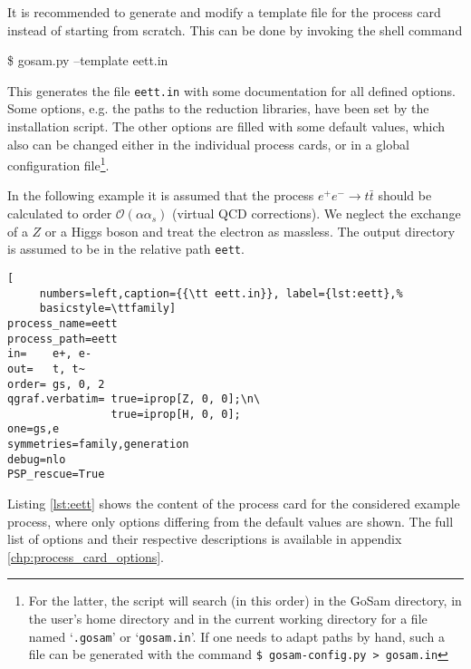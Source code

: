 \documentclass[11pt,a4paper]{refrep}
\newcommand{\gosamversion}{{3{.}0}}
\newcommand{\gosamv}[1][\gosamversion]{{\sc GoSam}\xspace}
\begin{document}
It is recommended to generate and modify a template file for the 
process card instead of
starting from scratch. This can be done by invoking the shell command
\begin{example}
\$ gosam.py --template eett.in
\end{example}
This generates the file \texttt{eett.in} with some documentation
for all defined options. Some options, e.g. the paths to the reduction libraries, 
have been set by the installation script.
The other options are filled with some default values,
which also can be changed either in the individual process cards, 
or in a global configuration file\footnote{
For the latter, the script will search (in this order) in the \gosamv{} directory,
in the user's home directory and in the current working directory for a file
named `\texttt{.gosam}' or `\texttt{gosam.in}'. If one needs to adapt paths by
hand, such a file can be generated with the command
{\tt \$ gosam-config.py > gosam.in}}.

In the following  example it is assumed that the process
$e^+e^-\rightarrow t\bar{t}$ should be calculated to order
$\mathcal{O}(\alpha\alpha_s)$ (virtual QCD corrections).
We neglect the exchange of a $Z$ or a Higgs boson and treat the electron as massless.
The output directory is assumed to be in the relative path
\texttt{eett}. 

\begin{lstlisting}[
     numbers=left,caption={{\tt eett.in}}, label={lst:eett},%
     basicstyle=\ttfamily] 
process_name=eett
process_path=eett
in=    e+, e-
out=   t, t~
order= gs, 0, 2
qgraf.verbatim= true=iprop[Z, 0, 0];\n\
                true=iprop[H, 0, 0];
one=gs,e
symmetries=family,generation
debug=nlo
PSP_rescue=True
\end{lstlisting}

Listing \ref{lst:eett} shows the content of the process card for the considered example process, where only options differing from the default values are shown. The full list of options and their respective descriptions is available in appendix \ref{chp:process_card_options}. 
\end{document}
